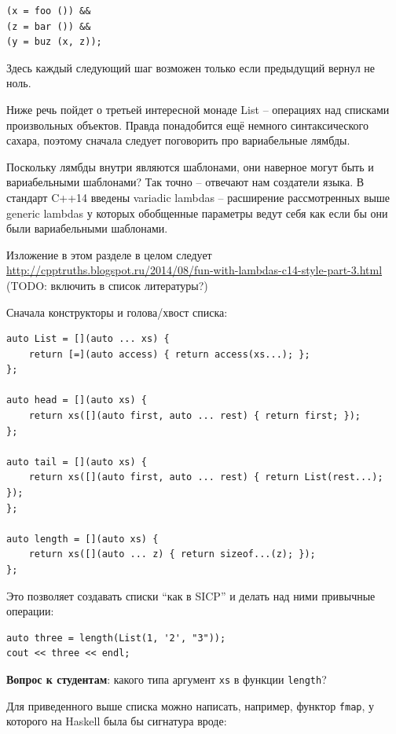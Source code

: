\documentclass[a4paper,12pt,oneside]{article}
\newif\ifanswers
\begin{document}
\begin{lstlisting}
(x = foo ()) &&
(z = bar ()) &&
(y = buz (x, z));
\end{lstlisting}

Здесь каждый следующий шаг возможен только если предыдущий вернул не ноль.

Ниже речь пойдет о третьей интересной монаде List -- операциях над списками произвольных объектов. Правда понадобится ещё немного синтаксического сахара, поэтому сначала следует поговорить про вариабельные лямбды.

Поскольку лямбды внутри являются шаблонами, они наверное могут быть и вариабельными шаблонами? Так точно -- отвечают нам создатели языка. В стандарт C++14 введены variadic lambdas -- расширение рассмотренных выше generic lambdas у которых обобщенные параметры ведут себя как если бы они были вариабельными шаблонами.

Изложение в этом разделе в целом следует \url{http://cpptruths.blogspot.ru/2014/08/fun-with-lambdas-c14-style-part-3.html} (TODO: включить в список литературы?)

Сначала конструкторы и голова/хвост списка:

\begin{lstlisting}
auto List = [](auto ... xs) {
    return [=](auto access) { return access(xs...); };
};

auto head = [](auto xs) {
    return xs([](auto first, auto ... rest) { return first; });
};

auto tail = [](auto xs) {
    return xs([](auto first, auto ... rest) { return List(rest...); });
};

auto length = [](auto xs) {
    return xs([](auto ... z) { return sizeof...(z); });
};
\end{lstlisting}

Это позволяет создавать списки ``как в SICP'' и делать над ними привычные операции:

\begin{lstlisting}
auto three = length(List(1, '2', "3")); 
cout << three << endl;
\end{lstlisting}

\textbf{Вопрос к студентам}: какого типа аргумент \lstinline!xs! в функции \lstinline!length!?

\ifanswers
Правильный ответ: \lstinline!std::function!
\fi

Для приведенного выше списка можно написать, например, функтор \lstinline!fmap!, у которого на Haskell была бы сигнатура вроде:
\end{document}
